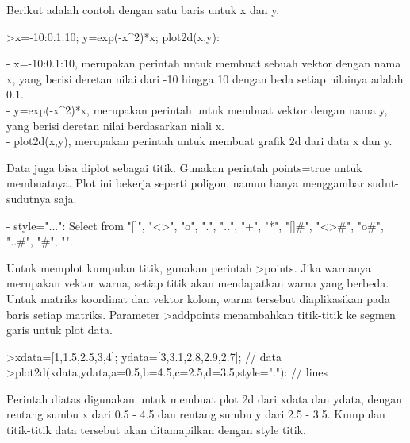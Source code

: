 \documentclass{article}
\begin{document}
\begin{eulernotebook}
\begin{eulercomment}
\begin{eulercomment}
\begin{eulercomment}
\begin{eulercomment}
\begin{eulercomment}
Berikut adalah contoh dengan satu baris untuk x dan y.
\end{eulercomment}
\begin{eulerprompt}
>x=-10:0.1:10; y=exp(-x^2)*x; plot2d(x,y):
\end{eulerprompt}
\begin{eulercomment}
- x=-10:0.1:10, merupakan perintah untuk membuat sebuah vektor dengan
nama x, yang berisi deretan nilai dari -10 hingga 10 dengan beda
setiap nilainya adalah 0.1.\\
- y=exp(-x\textasciicircum{}2)*x, merupakan perintah untuk membuat vektor dengan nama
y, yang berisi deretan nilai berdasarkan niali x.\\
- plot2d(x,y), merupakan perintah untuk membuat grafik 2d dari data x
dan y.

Data juga bisa diplot sebagai titik. Gunakan perintah points=true
untuk membuatnya. Plot ini bekerja seperti poligon, namun hanya
menggambar sudut-sudutnya saja.

- style="...": Select from "[]", "\textless{}\textgreater{}", "o", ".", "..", "+", "*",
"[]#", "\textless{}\textgreater{}#", "o#", "..#", "#", "\textbar{}".

Untuk memplot kumpulan titik, gunakan perintah \textgreater{}points. Jika warnanya
merupakan vektor warna, setiap titik akan mendapatkan warna yang
berbeda. Untuk matriks koordinat dan vektor kolom, warna tersebut
diaplikasikan pada baris setiap matriks. Parameter \textgreater{}addpoints
menambahkan titik-titik ke segmen garis untuk plot data.
\end{eulercomment}
\begin{eulerprompt}
>xdata=[1,1.5,2.5,3,4]; ydata=[3,3.1,2.8,2.9,2.7]; // data
>plot2d(xdata,ydata,a=0.5,b=4.5,c=2.5,d=3.5,style="."): // lines
\end{eulerprompt}
\begin{eulercomment}
Perintah diatas digunakan untuk membuat plot 2d dari xdata dan ydata,
dengan rentang sumbu x dari 0.5 - 4.5 dan rentang sumbu y dari 2.5 -
3.5. Kumpulan titik-titik data tersebut akan ditamapilkan dengan style
titik.


\end{eulercomment}
\end{eulercomment}
\end{eulercomment}
\end{eulercomment}
\end{eulercomment}
\end{eulernotebook}
\end{document}
